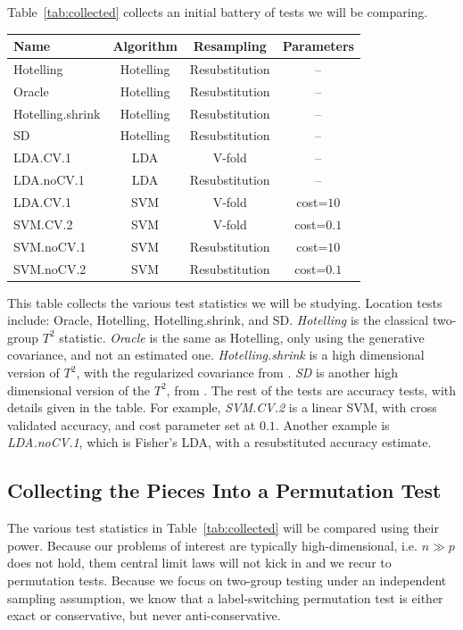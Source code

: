 \documentclass[12pt,a4paper]{article}
\begin{document}
Table~\ref{tab:collected} collects an initial battery of tests we will be comparing. 
\begin{tcolorbox}
\centering
\begin{tabular}{l|c|c|c}
Name & Algorithm & Resampling & Parameters\\ 
\hline
\hline
Hotelling & Hotelling & Resubstitution & -- \\ 
Oracle & Hotelling & Resubstitution & -- \\ 
Hotelling.shrink & Hotelling & Resubstitution & -- \\ 
SD & Hotelling & Resubstitution & -- \\ 
LDA.CV.1 	& LDA & V-fold 			&  -- \\ 
LDA.noCV.1 	& LDA & Resubstitution 	&  --\\ 
LDA.CV.1 	& SVM & V-fold 		    & cost=$10$ \\ 
SVM.CV.2 	& SVM & V-fold 		    & cost=$0.1$ \\ 
SVM.noCV.1 	& SVM & Resubstitution  & cost=$10$ \\ 
SVM.noCV.2 	& SVM & Resubstitution  & cost=$0.1$ \\ 
\end{tabular} 
\captionsetup{type=table}
\caption{\footnotesize
This table collects the various test statistics we will be studying. 
Location tests include: Oracle, Hotelling, Hotelling.shrink, and SD.
\textit{Hotelling} is the classical two-group $T^2$ statistic. 
\textit{Oracle} is the same as Hotelling, only using the generative covariance, and not an estimated one.
\textit{Hotelling.shrink} is a high dimensional version of $T^2$, with the regularized covariance from \citet{schafer_shrinkage_2005}. 
\textit{SD} is another high dimensional version of the $T^2$, from \citet{srivastava_two_2013}.
The rest of the tests are accuracy tests, with details given in the table. 
For example, \textit{SVM.CV.2} is a linear SVM, with cross validated accuracy, and cost parameter set at $0.1$.
Another example is \textit{LDA.noCV.1}, which is Fisher's LDA, with a resubstituted accuracy estimate.}
\label{tab:collected}
\end{tcolorbox}


\subsection{Collecting the Pieces Into a Permutation Test}
The various test statistics in Table~\ref{tab:collected} will be compared using their power. 
Because our problems of interest are typically high-dimensional, i.e. $n \gg p$ does not hold, them central limit laws will not kick in and we recur to permutation tests.
Because we focus on two-group testing under an independent sampling assumption, we know that a label-switching permutation test is either exact or conservative, but never anti-conservative. 
\end{document}
